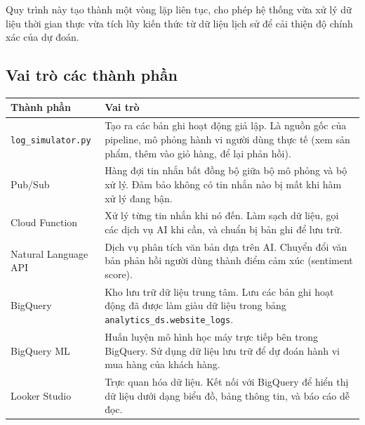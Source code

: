Quy trình này tạo thành một vòng lặp liên tục, cho phép hệ thống vừa xử lý dữ liệu thời gian thực vừa tích lũy kiến thức từ dữ liệu lịch sử để cải thiện độ chính xác của dự đoán.

\subsection{Vai trò các thành phần}

\begin{table}[t]
\centering
\begin{tabular}{|p{3.5cm}|p{9cm}|}
\hline
\textbf{Thành phần} & \textbf{Vai trò} \\
\hline
\texttt{log\_simulator.py} & Tạo ra các bản ghi hoạt động giả lập. Là nguồn gốc của pipeline, mô phỏng hành vi người dùng thực tế (xem sản phẩm, thêm vào giỏ hàng, để lại phản hồi). \\
\hline
Pub/Sub & Hàng đợi tin nhắn bất đồng bộ giữa bộ mô phỏng và bộ xử lý. Đảm bảo không có tin nhắn nào bị mất khi hàm xử lý đang bận. \\
\hline
Cloud Function & Xử lý từng tin nhắn khi nó đến. Làm sạch dữ liệu, gọi các dịch vụ AI khi cần, và chuẩn bị bản ghi để lưu trữ. \\
\hline
Natural Language API & Dịch vụ phân tích văn bản dựa trên AI. Chuyển đổi văn bản phản hồi người dùng thành điểm cảm xúc (sentiment score). \\
\hline
BigQuery & Kho lưu trữ dữ liệu trung tâm. Lưu các bản ghi hoạt động đã được làm giàu dữ liệu trong bảng \texttt{analytics\_ds.website\_logs}. \\
\hline
BigQuery ML & Huấn luyện mô hình học máy trực tiếp bên trong BigQuery. Sử dụng dữ liệu lưu trữ để dự đoán hành vi mua hàng của khách hàng. \\
\hline
Looker Studio & Trực quan hóa dữ liệu. Kết nối với BigQuery để hiển thị dữ liệu dưới dạng biểu đồ, bảng thông tin, và báo cáo dễ đọc. \\
\hline
\end{tabular}
\end{table}
